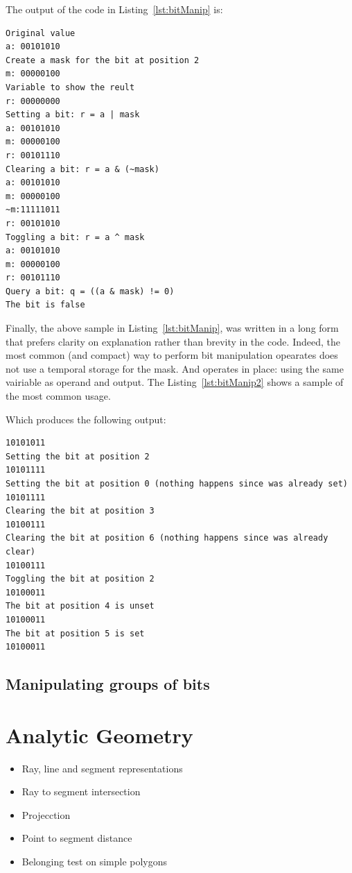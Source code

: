 The output of the code in Listing~\ref{lst:bitManip} is:
\begin{verbatim}
Original value
a: 00101010
Create a mask for the bit at position 2
m: 00000100
Variable to show the reult
r: 00000000
Setting a bit: r = a | mask
a: 00101010
m: 00000100
r: 00101110
Clearing a bit: r = a & (~mask)
a: 00101010
m: 00000100
~m:11111011
r: 00101010
Toggling a bit: r = a ^ mask
a: 00101010
m: 00000100
r: 00101110
Query a bit: q = ((a & mask) != 0)
The bit is false
\end{verbatim}

Finally, the above sample in Listing~\ref{lst:bitManip}, was written in a long form that prefers clarity on explanation rather than brevity in the code.
Indeed, the most common (and compact) way to perform bit manipulation opearates does not use a temporal storage for the mask.
And operates in place: using the same vairiable as operand and output.
The Listing~\ref{lst:bitManip2} shows a sample of the most common usage.

{\centering
\begin{minipage}{\linewidth}
\end{minipage}
\par
}

Which produces the following output:
\begin{verbatim}
10101011
Setting the bit at position 2
10101111
Setting the bit at position 0 (nothing happens since was already set)
10101111
Clearing the bit at position 3
10100111
Clearing the bit at position 6 (nothing happens since was already clear)
10100111
Toggling the bit at position 2
10100011
The bit at position 4 is unset
10100011
The bit at position 5 is set
10100011  
\end{verbatim}

\subsection{Manipulating groups of bits}


\section{Analytic Geometry}
\begin{itemize}
  \item Ray, line and segment representations
  \item Ray to segment intersection
  \item Projecction
  \item Point to segment distance
  \item Belonging test on simple polygons
\end{itemize}

